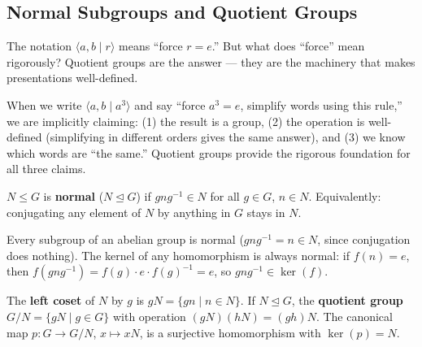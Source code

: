 \documentclass[11pt]{report}
\begin{document}
\subsection{Normal Subgroups and Quotient Groups}

The notation $\langle a, b \mid r \rangle$ means ``force $r = e$.'' But what does ``force'' mean rigorously? Quotient groups are the answer --- they are the machinery that makes presentations well-defined.

\begin{rembox}
When we write $\langle a, b \mid a^3 \rangle$ and say ``force $a^3 = e$, simplify words using this rule,'' we are implicitly claiming: (1) the result is a group, (2) the operation is well-defined (simplifying in different orders gives the same answer), and (3) we know which words are ``the same.'' Quotient groups provide the rigorous foundation for all three claims.
\end{rembox}

\begin{defbox}
$N \leq G$ is \textbf{normal} ($N \trianglelefteq G$) if $gng^{-1} \in N$ for all $g \in G$, $n \in N$. Equivalently: conjugating any element of $N$ by anything in $G$ stays in $N$.
\end{defbox}

\begin{rembox}
Every subgroup of an abelian group is normal ($gng^{-1} = n \in N$, since conjugation does nothing). The kernel of any homomorphism is always normal: if $f(n) = e$, then $f(gng^{-1}) = f(g) \cdot e \cdot f(g)^{-1} = e$, so $gng^{-1} \in \ker(f)$.
\end{rembox}

\begin{defbox}
The \textbf{left coset} of $N$ by $g$ is $gN = \{gn \mid n \in N\}$. If $N \trianglelefteq G$, the \textbf{quotient group} $G/N = \{gN \mid g \in G\}$ with operation $(gN)(hN) = (gh)N$. The canonical map $p: G \to G/N$, $x \mapsto xN$, is a surjective homomorphism with $\ker(p) = N$.
\end{defbox}
\end{document}
